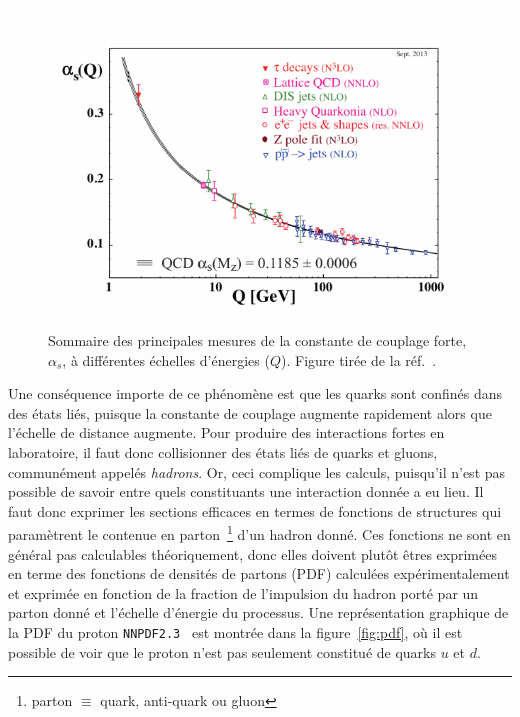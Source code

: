 \begin{figure}
  \centering
  \includegraphics{alpha_s.pdf}
  \caption{Sommaire des principales mesures de la constante de couplage forte, $\alpha_s$, à différentes échelles d'énergies ($Q$). Figure tirée de la réf.~\cite{olive_qcd_2014}.}
\label{fig:alpha_s}
\end{figure}

Une conséquence importe de ce phénomène est que les quarks sont
confinés dans des états liés, puisque la constante de couplage
augmente rapidement alors que l'échelle de distance augmente. Pour
produire des interactions fortes en laboratoire, il faut donc
collisionner des états liés de quarks et gluons, communément appelés
\emph{hadrons}. Or, ceci complique les calculs, puisqu'il n'est pas
possible de savoir entre quels constituants une interaction donnée a
eu lieu. Il faut donc exprimer les sections efficaces en termes de
fonctions de structures qui paramètrent le contenue en
parton~\footnote{parton $\equiv$ quark, anti-quark ou gluon} d'un
hadron donné. Ces fonctions ne sont en général pas calculables
théoriquement, donc elles doivent plutôt êtres exprimées en terme des
fonctions de densités de partons (PDF) calculées expérimentalement et
exprimée en fonction de la fraction de l'impulsion du hadron porté par
un parton donné et l'échelle d'énergie du processus. Une
représentation graphique de la PDF du proton
\texttt{NNPDF2.3}~\cite{ball_parton_2013} est montrée dans la
figure~\ref{fig:pdf}, où il est possible de voir que le proton n'est
pas seulement constitué de quarks $u$ et $d$.

